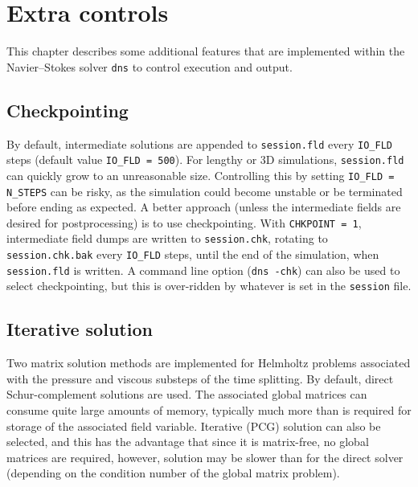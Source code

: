 \documentclass[11pt,a4paper]{report}
\begin{document}
\chapter{Extra controls}

This chapter describes some additional features that are implemented
within the Navier--Stokes solver \verb+dns+ to control execution and
output.

\section{Checkpointing}

By default, intermediate solutions are appended to \verb+session.fld+
every \verb+IO_FLD+ steps (default value \verb+IO_FLD = 500+).  For
lengthy or 3D simulations, \verb+session.fld+ can quickly grow to an
unreasonable size.  Controlling this by setting \verb+IO_FLD = N_STEPS+
can be risky, as the simulation could become unstable or be terminated
before ending as expected.  A better approach (unless the intermediate
fields are desired for postprocessing) is to use checkpointing.  With
\verb+CHKPOINT = 1+, intermediate field dumps are written to
\verb+session.chk+, rotating to \verb+session.chk.bak+ every
\verb+IO_FLD+ steps, until the end of the simulation, when
\verb+session.fld+ is written.  A command line option (\verb+dns -chk+)
can also be used to select checkpointing, but this is
over-ridden by whatever is set in the \verb+session+ file.

\section{Iterative solution}

Two matrix solution methods are implemented for Helmholtz problems
associated with the pressure and viscous substeps of the time
splitting.  By default, direct Schur-complement solutions are used.
The associated global matrices can consume quite large amounts of
memory, typically much more than is required for storage of the
associated field variable.  Iterative (PCG) solution can also be
selected, and this has the advantage that since it is matrix-free, no
global matrices are required, however, solution may be slower than for
the direct solver (depending on the condition number of the global
matrix problem).
\end{document}
